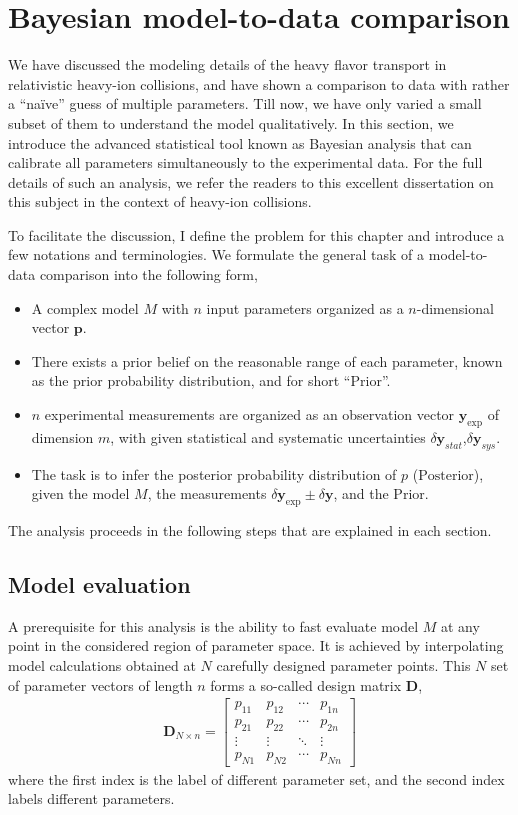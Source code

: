 \chapter{Bayesian model-to-data comparison}
\label{chapter:bayes}
We have discussed the modeling details of the heavy flavor transport in relativistic heavy-ion collisions, and have shown a comparison to data with rather a ``na\"ive'' guess of multiple parameters.
Till now, we have only varied a small subset of them to understand the model qualitatively.
In this section, we introduce the advanced statistical tool known as Bayesian analysis that can calibrate all parameters simultaneously to the experimental data.
For the full details of such an analysis, we refer the readers to this excellent dissertation on this subject \cite{Bernhard:2018hnz} in the context of heavy-ion collisions.

To facilitate the discussion, I define the problem for this chapter and introduce a few notations and terminologies.
We formulate the general task of a model-to-data comparison into the following form,
\begin{itemize}
\item A complex model $M$ with $n$ input parameters organized as a $n$-dimensional vector $\mathbf{p}$.
\item There exists a prior belief on the reasonable range of each parameter, known as the prior probability distribution, and for short ``$\mathrm{Prior}$''.
\item $n$ experimental measurements are organized as an observation vector $\mathbf{y}_{\exp}$ of dimension $m$, with given statistical and systematic uncertainties $\delta\mathbf{y}_{stat}$,$\delta\mathbf{y}_{sys}$.
\item The task is to infer the posterior probability distribution of $p$ ($\mathrm{Posterior}$), given the model $M$, the measurements $\delta\mathbf{y}_{\exp}\pm \delta \mathbf{y}$, and the $\mathrm{Prior}$.
\end{itemize}
The analysis proceeds in the following steps that are explained in each section.

\section{Model evaluation}
A prerequisite for this analysis is the ability to fast evaluate model $M$ at any point in the considered region of parameter space.
It is achieved by interpolating model calculations obtained at $N$ carefully designed parameter points.
This $N$ set of parameter vectors of length $n$ forms a so-called design matrix $\mathbf{D}$,
\begin{eqnarray}
\mathbf{D}_{N\times n} = 
\begin{bmatrix}
p_{11} & p_{12} & \cdots & p_{1n}\\
p_{21} & p_{22} & \cdots & p_{2n}\\
\vdots & \vdots & \ddots & \vdots \\
p_{N1} & p_{N2} & \cdots & p_{Nn}
\end{bmatrix}
\end{eqnarray}
where the first index is the label of different parameter set, and the second index labels different parameters.

